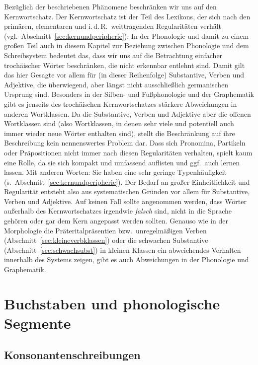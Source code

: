 Bezüglich der beschriebenen Phänomene beschränken wir uns auf den Kernwortschatz.
Der Kernwortschatz ist der Teil des Lexikons, der sich nach den primären, elementaren und i.\,d.\,R.\ weittragenden Regularitäten verhält (vgl.\ Abschnitt~\ref{sec:kernundperipherie}).
In der Phonologie und damit zu einem großen Teil auch in diesem Kapitel zur Beziehung zwischen Phonologie und dem Schreibsystem bedeutet das, dass wir uns auf die Betrachtung einfacher trochäischer Wörter beschränken, die nicht erkennbar entlehnt sind.
Damit gilt das hier Gesagte vor allem für (in dieser Reihenfolge) Substantive, Verben und Adjektive, die überwiegend, aber längst nicht ausschließlich germanischen Ursprung sind.
Besonders in der Silben- und Fußphonologie und der Graphematik gibt es jenseits des trochäischen Kernwortschatzes stärkere Abweichungen in anderen Wortklassen.
Da die Substantive, Verben und Adjektive aber die offenen Wortklassen sind (also Wortklassen, in denen sehr viele und potentiell auch immer wieder neue Wörter enthalten sind), stellt die Beschränkung auf ihre Beschreibung kein nennenswertes Problem dar.
Dass sich Pronomina, Partikeln oder Präpositionen nicht immer nach diesen Regularitäten verhalten, spielt kaum eine Rolle, da sie sich kompakt und umfassend auflisten und ggf.\ auch lernen lassen.
Mit anderen Worten:
Sie haben eine sehr geringe Typenhäufigkeit (s.\ Abschnitt~\ref{sec:kernundperipherie}).
Der Bedarf an großer Einheitlichkeit und Regularität entsteht also aus systematischen Gründen vor allem für Substantive, Verben und Adjektive.
Auf keinen Fall sollte angenommen werden, dass Wörter außerhalb des Kernwortschatzes irgendwie \textit{falsch} sind, nicht in die Sprache gehören oder gar dem Kern angepasst werden sollten.
Genauso wie in der Morphologie die Präteritalpräsentien bzw.\ unregelmäßigen Verben (Abschnitt~\ref{sec:kleineverbklassen}) oder die schwachen Substantive (Abschnitt~\ref{sec:schwachsubst}) in kleinen Klassen ein abweichendes Verhalten innerhalb des Systems zeigen, gibt es auch Abweichungen in der Phonologie und Graphematik.

\section{Buchstaben und phonologische Segmente}

\label{sec:buchstabensegmente}

\subsection{Konsonantenschreibungen}

